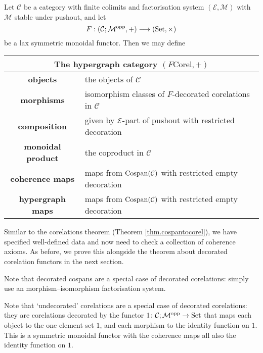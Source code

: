 \begin{theorem} \label{thm.fcorel}
  Let $\mathcal C$ be a category with finite colimits and factorisation system
  $(\mathcal E, \mathcal M)$ with $\mathcal M$ stable under pushout, and let 
  \[
    F: (\mathcal C;\mathcal M^{\mathrm{opp}},+) \longrightarrow (\mathrm{Set}, \times)
  \]
  be a lax symmetric monoidal functor.  Then we may define 
  \begin{center}
    \begin{tabular}{| c | p{} |}
      \hline
      \multicolumn{2}{|c|}{The hypergraph category $(F\mathrm{Corel},+)$} \\
      \hline
      \textbf{objects} & the objects of $\mathcal C$ \\ 
      \textbf{morphisms} & isomorphism classes of $F$-decorated corelations in
      $\mathcal C$\\ 
      \textbf{composition} & given by $\mathcal E$-part of pushout with restricted
      decoration  \\
      \textbf{monoidal product} & the coproduct in $\mathcal C$  \\
      \textbf{coherence maps} & maps from $\operatorname{{Cospan}}(\mathcal C)$ with restricted empty
      decoration \\
      \textbf{hypergraph maps} & maps from $\operatorname{{Cospan}}(\mathcal C)$ with restricted empty
      decoration \\
      \hline
    \end{tabular}
  \end{center}
\end{theorem}
Similar to the corelations theorem (Theorem \ref{thm.cospantocorel}), we have
specified well-defined data and now need to check a collection of coherence
axioms. As before, we prove this alongside the theorem about decorated
corelation functors in the next section.

\begin{example}
  Note that decorated cospans are a special case of decorated corelations:
  simply use an morphism--isomorphism factorisation system.
\end{example}

\begin{example} \label{ex.undeccorel}
  Note that `undecorated' corelations are a special case of decorated
  corelations: they are corelations decorated by the functor $1{\colon} \mathcal C;\mathcal
  M^{\mathrm{opp}} \to \mathrm{Set}$ that maps each object to the one element set $1$, and each
  morphism to the identity function on $1$. This is a symmetric monoidal functor
  with the coherence maps all also the identity function on $1$.
\end{example}


